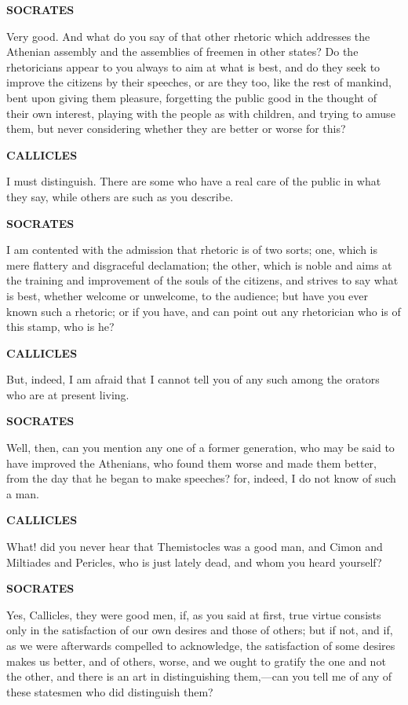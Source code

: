 \documentclass[11pt,letter]{article}
\begin{document}
\par \textbf{SOCRATES}
\par   Very good. And what do you say of that other rhetoric which addresses the Athenian assembly and the assemblies of freemen in other states? Do the rhetoricians appear to you always to aim at what is best, and do they seek to improve the citizens by their speeches, or are they too, like the rest of mankind, bent upon giving them pleasure, forgetting the public good in the thought of their own interest, playing with the people as with children, and trying to amuse them, but never considering whether they are better or worse for this?

\par \textbf{CALLICLES}
\par   I must distinguish. There are some who have a real care of the public in what they say, while others are such as you describe.

\par \textbf{SOCRATES}
\par   I am contented with the admission that rhetoric is of two sorts; one, which is mere flattery and disgraceful declamation; the other, which is noble and aims at the training and improvement of the souls of the citizens, and strives to say what is best, whether welcome or unwelcome, to the audience; but have you ever known such a rhetoric; or if you have, and can point out any rhetorician who is of this stamp, who is he?

\par \textbf{CALLICLES}
\par   But, indeed, I am afraid that I cannot tell you of any such among the orators who are at present living.

\par \textbf{SOCRATES}
\par   Well, then, can you mention any one of a former generation, who may be said to have improved the Athenians, who found them worse and made them better, from the day that he began to make speeches? for, indeed, I do not know of such a man.

\par \textbf{CALLICLES}
\par   What! did you never hear that Themistocles was a good man, and Cimon and Miltiades and Pericles, who is just lately dead, and whom you heard yourself?

\par \textbf{SOCRATES}
\par   Yes, Callicles, they were good men, if, as you said at first, true virtue consists only in the satisfaction of our own desires and those of others; but if not, and if, as we were afterwards compelled to acknowledge, the satisfaction of some desires makes us better, and of others, worse, and we ought to gratify the one and not the other, and there is an art in distinguishing them,—can you tell me of any of these statesmen who did distinguish them?
\end{document}
